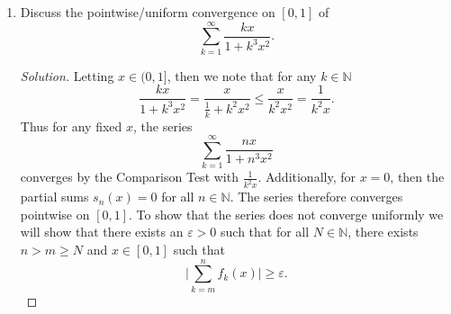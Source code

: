 \documentclass[12pt]{article}
\newenvironment{solution}
{\renewcommand\qedsymbol{$\blacksquare$}\begin{proof}[Solution]}
{\end{proof}}
\begin{document}
\begin{enumerate}
\begin{proof}
\begin{align*}
                    |f_{n+1}(x)|&=\bigg|f_{n+1}(x)+\sum_{k=n+2}^{\infty}
                    f_k(x)-\sum_{k=n+2}^{\infty}f_k(x)\bigg|
                    \\
                    &\leq\bigg|\sum_{k=n+1}^{\infty}f_k(x)\bigg|
                    +\bigg|\sum_{k=n+2}^{\infty}f_k(x)\bigg| \\
                    &<\frac{\varepsilon}{2}+\frac{\varepsilon}{2}=\varepsilon.
                \end{align*}
                By (1) and the above inequality we then get that 
                \begin{equation*}
                    \sup_{x\in I}|f_n(x)|<\varepsilon.
                \end{equation*}
                Therefore $\{f_n\}_n$ converges uniformly to $f=0$ on $I$. 
            \end{proof}
        \item Discuss the pointwise/uniform convergence on $[0, 1]$ of 
            \begin{equation*}
                \sum_{k=1}^{\infty}\frac{kx}{1+k^3x^2}.
            \end{equation*}
            \begin{solution}
                Letting $x\in(0, 1]$, then we note that for any
                $k\in\mathbb{N}$
                \begin{equation*}
                    \frac{kx}{1+k^3x^2}=\frac{x}{\frac{1}{k}+k^2x^2}
                    \leq\frac{x}{k^2x^2}=\frac{1}{k^2x}.
                \end{equation*}
                Thus for any fixed $x$, the series
                \begin{equation*}
                    \sum_{k=1}^{\infty}\frac{nx}{1+n^3x^2}
                \end{equation*}
                converges by the Comparison Test with
                $\frac{1}{k^2x}$. Additionally, for $x=0$, then the partial
                sums $s_n(x)=0$ for all $n\in\mathbb{N}$. The series therefore
                converges pointwise on $[0, 1]$. 
                To show that the series does not converge uniformly we will
                show that there exists an $\varepsilon>0$ such that for all
                $N\in\mathbb{N}$, there exists $n>m\geq N$ and $x\in[0, 1]$ such that
                \begin{equation*}
                    \bigg|\sum_{k=m}^{n}f_k(x)\bigg|\geq\varepsilon.
                \end{equation*}

\end{solution}
\end{enumerate}
\end{document}
